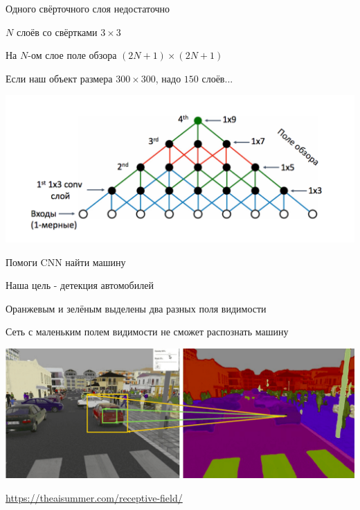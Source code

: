 \documentclass[notes,12pt, aspectratio=169]{beamer}
\newenvironment{wideitemize}{\itemize\addtolength{\itemsep}{10pt}}{\enditemize}
\begin{document}
\begin{frame}{Одного свёрточного слоя недостаточно}
\begin{wideitemize}
\item  $N$ слоёв со свёртками $3 \times 3$ 
\item  На $N$-ом слое поле обзора  $(2N + 1) \times (2N + 1)$
\item  Если наш объект размера $300 \times 300$, надо $150$ слоёв... 
\end{wideitemize}

\begin{center}
\includegraphics[width=.8\linewidth]{rec_field2.png}
\end{center}
\end{frame}


\begin{frame}{Помоги CNN найти машину}
\begin{wideitemize}
	\item Наша цель - детекция автомобилей	
	\item  Оранжевым и зелёным выделены два разных поля видимости
	\item  \alert{Сеть с маленьким полем видимости не сможет распознать машину} 
\end{wideitemize}

\begin{center}
	\includegraphics[width=.7\linewidth]{receptive-fields-semantic-segmentation.png}
\end{center}
\vfill %
\footnotesize
\color{blue} \url{https://theaisummer.com/receptive-field/}
\end{frame}
\end{document}
